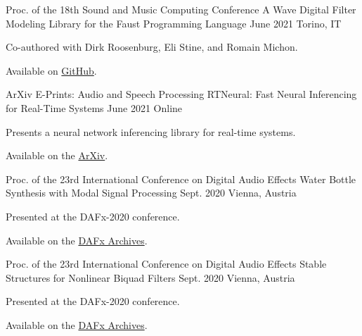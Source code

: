 \begin{cventries}
  \cventry
    {Proc. of the 18th Sound and Music Computing Conference} %
    {A Wave Digital Filter Modeling Library for the Faust Programming Language} %
    {June 2021} %
    {Torino, IT} %
    {
      \begin{cvitems} %
        \item {Co-authored with Dirk Roosenburg, Eli Stine, and Romain Michon.}
        \item {Available on \href{https://github.com/droosenb/faust-wdf-library/blob/main/SMC-2021-paper/a-wave-digital-filter-modeling-library-for-faust.pdf}{GitHub}.}
      \end{cvitems}
    }

  \cventry
    {ArXiv E-Prints: Audio and Speech Processing} %
    {RTNeural: Fast Neural Inferencing for Real-Time Systems} %
    {June 2021} %
    {Online} %
    {
      \begin{cvitems} %
        \item {Presents a neural network inferencing library for real-time systems.}
        \item {Available on the \href{https://arxiv.org/pdf/2106.03037.pdf}{ArXiv}.}
      \end{cvitems}
    }

  \cventry
    {Proc. of the 23rd International Conference on Digital Audio Effects} %
    {Water Bottle Synthesis with Modal Signal Processing} %
    {Sept. 2020} %
    {Vienna, Austria} %
    {
      \begin{cvitems} %
        \item {Presented at the DAFx-2020 conference.}
        \item {Available on the \href{https://www.dafx.de/paper-archive/2020/proceedings/papers/DAFx2020_paper_24.pdf}{DAFx Archives}.}
      \end{cvitems}
    }

  \cventry
    {Proc. of the 23rd International Conference on Digital Audio Effects} %
    {Stable Structures for Nonlinear Biquad Filters} %
    {Sept. 2020} %
    {Vienna, Austria} %
    {
      \begin{cvitems} %
        \item {Presented at the DAFx-2020 conference.}
        \item {Available on the \href{https://www.dafx.de/paper-archive/2020/proceedings/papers/DAFx2020_paper_3.pdf}{DAFx Archives}.}
      \end{cvitems}
    }


\end{cventries}
